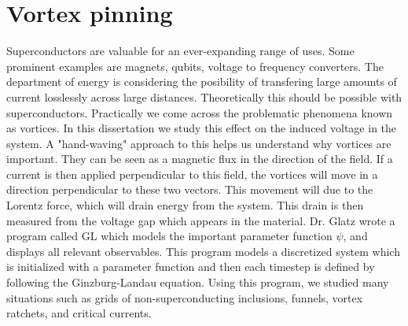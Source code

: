 \section{Vortex pinning}
Superconductors are valuable for an ever-expanding range of uses. Some prominent examples are magnets, qubits, voltage to frequency converters. The department of energy is considering the posibility of transfering large amounts of current losslessly across large distances. Theoretically this should be possible with superconductors. Practically we come across the problematic phenomena known as vortices.  In this dissertation we study this effect on the induced voltage in the system. A "hand-waving" approach to this helps us understand why vortices are important. They can be seen as a magnetic flux in the direction of the field. If a current is then applied perpendicular to this field, the vortices will move in a direction perpendicular to these two vectors. This movement will due to the Lorentz force, which will drain energy from the system. This drain is then measured from the voltage gap which appears in the material. Dr. Glatz wrote a program called {\sc GL} which models the important parameter function $\psi$, and displays all relevant observables. This program models a discretized system which is initialized with a parameter function and then each timestep is defined by following the Ginzburg-Landau equation. Using this program, we studied many situations such as grids of non-superconducting inclusions, funnels, vortex ratchets, and critical currents. 


